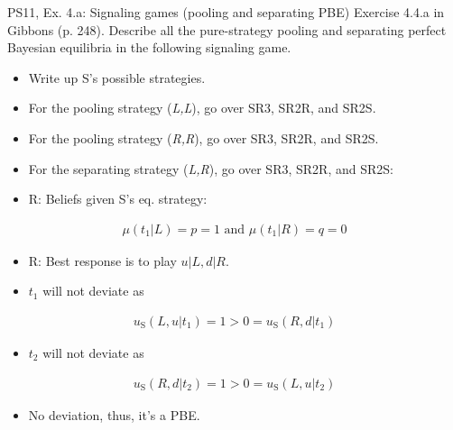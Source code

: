 \begin{frame}{PS11, Ex. 4.a: Signaling games (pooling and separating PBE)}
    Exercise 4.4.a in Gibbons (p. 248). Describe all the pure-strategy pooling and separating perfect Bayesian equilibria in the following signaling game.\vspace{-8pt}
    \begin{multicols}{2}
      \begin{itemize}
        \item[Step 1:] Write up S's possible strategies.
        \item[Step 2:] For the pooling strategy (\textit{L,L}), go over SR3, SR2R, and SR2S.
        \item[Step 3:] For the pooling strategy (\textit{R,R}), go over SR3, SR2R, and SR2S.
        \item[Step 4:] For the separating strategy (\textit{L,R}), go over SR3, SR2R, and SR2S:
        \item[SR3:] R: Beliefs given S's eq. strategy:
      \end{itemize}\vspace{-10pt}
      \begin{align*}
        \mu(t_1|L)=p=1\text{ and }\mu(t_1|R)=q=0
      \end{align*}\vspace{-18pt}
      \begin{itemize}
        \item[SR2R:] R: Best response is to play $u|L,d|R$.
        \item[SR2S:] $t_1$ will not deviate as
      \end{itemize}\vspace{-10pt}
      \begin{align*}
        u_\text{S}(L,u|t_1)=1>0=u_\text{S}(R,d|t_1)
      \end{align*}\vspace{-20pt}
      \begin{itemize}
        \item[] $t_2$ will not deviate as
      \end{itemize}\vspace{-10pt}
      \begin{align*}
        u_\text{S}(R,d|t_2)=1>0=u_\text{S}(L,u|t_2)
      \end{align*}\vspace{-20pt}
      \begin{itemize}
        \item[PBE:] No deviation, thus, it's a PBE.

\end{itemize}
\end{multicols}
\end{frame}
